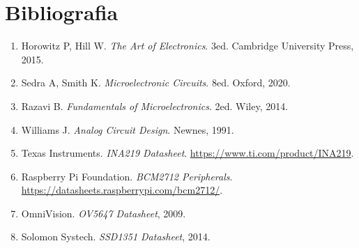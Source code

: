 \documentclass[11pt,a4paper,oneside,openright]{book}
\begin{document}
\backmatter
\chapter*{Bibliografia}

\begin{enumerate}[leftmargin=2em]
\item Horowitz P, Hill W. \emph{The Art of Electronics}. 3ed. Cambridge
  University Press, 2015.
\item Sedra A, Smith K. \emph{Microelectronic Circuits}. 8ed. Oxford, 2020.
\item Razavi B. \emph{Fundamentals of Microelectronics}. 2ed. Wiley, 2014.
\item Williams J. \emph{Analog Circuit Design}. Newnes, 1991.
\item Texas Instruments. \emph{INA219 Datasheet}. \url{https://www.ti.com/product/INA219}.
\item Raspberry Pi Foundation. \emph{BCM2712 Peripherals}. \url{https://datasheets.raspberrypi.com/bcm2712/}.
\item OmniVision. \emph{OV5647 Datasheet}, 2009.
\item Solomon Systech. \emph{SSD1351 Datasheet}, 2014.
\end{enumerate}
\end{document}

